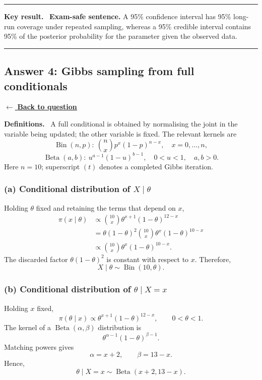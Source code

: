 \documentclass[11pt,a4paper]{article}
\newcommand{\given}{\mathrel{|}}
\newcommand{\answernav}[1]{%
  \label{answer:#1}%
  \noindent\hyperref[question:#1]{$\leftarrow$ \textbf{Back to question}}%
  \par\smallskip}
\newcommand{\studyheading}[1]{%
  \par\medskip\noindent\textcolor{statblue}{\textbf{#1.}}\ }
\newenvironment{keyresult}
  {\begin{center}\begin{minipage}{0.92\linewidth}\color{statblue}%
   \hrule\vspace{6pt}\textbf{Key result.}\ }
  {\vspace{6pt}\hrule\end{minipage}\end{center}}
\begin{document}
\begin{keyresult}
\textbf{Exam-safe sentence.} A 95\% confidence interval has 95\% long-run
coverage under repeated sampling, whereas a 95\% credible interval contains
95\% of the posterior probability for the parameter given the observed data.
\end{keyresult}

\clearpage

\subsection{Answer 4: Gibbs sampling from full conditionals}
\answernav{4}

\studyheading{Definitions}
A full conditional is obtained by normalising the joint in the variable being updated; the other variable is fixed.
The relevant kernels are
\[
\operatorname{Bin}(n,p):\ \binom nx p^x(1-p)^{n-x},\quad x=0,\ldots,n,
\]
\[
\operatorname{Beta}(a,b):\ u^{a-1}(1-u)^{b-1},\quad 0<u<1,\quad a,b>0.
\]
Here $n=10$; superscript $(t)$ denotes a completed Gibbs iteration.

\subsubsection*{(a) Conditional distribution of $X\given\theta$}

Holding $\theta$ fixed and retaining the terms that depend on $x$,
\begin{align*}
  \pi(x\given\theta)
  &\propto
    \binom{10}{x}\theta^{x+1}(1-\theta)^{12-x}\\
  &=\theta(1-\theta)^2
    \binom{10}{x}\theta^x(1-\theta)^{10-x}\\
  &\propto
    \binom{10}{x}\theta^x(1-\theta)^{10-x}.
\end{align*}
The discarded factor $\theta(1-\theta)^2$ is constant with respect to $x$.
Therefore,
\[
  \boxed{X\given\theta\sim\operatorname{Bin}(10,\theta)}.
\]

\subsubsection*{(b) Conditional distribution of $\theta\given X=x$}

Holding $x$ fixed,
\[
  \pi(\theta\given x)
  \propto
  \theta^{x+1}(1-\theta)^{12-x},
  \qquad 0<\theta<1.
\]
The kernel of a $\operatorname{Beta}(\alpha,\beta)$ distribution is
\[
  \theta^{\alpha-1}(1-\theta)^{\beta-1}.
\]
Matching powers gives
\[
  \alpha=x+2,
  \qquad
  \beta=13-x.
\]
Hence,
\[
  \boxed{
    \theta\given X=x
    \sim\operatorname{Beta}(x+2,13-x)
  }.
\]
\end{document}
